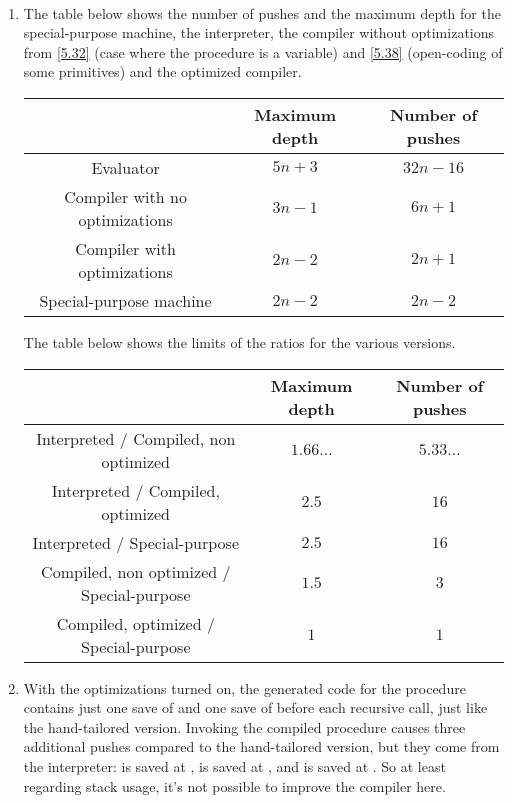 \begin{exe}[5.45]
    \ \vspace{-20pt}
    \begin{enumerate}
	\item The table below shows the number of pushes and the maximum depth 
	    for the special-purpose machine, the interpreter, the compiler 
	    without optimizations from \autoref{5.32} (case where the procedure 
	    is a variable) and \autoref{5.38} (open-coding of some primitives) 
	    and the optimized compiler.
	    \begin{center}
		\begin{tabular}{|c|c|c|}
		    \hline
		    & Maximum depth & Number of pushes \\\hline
		    Evaluator & $5n + 3$ & $32n - 16$ \\\hline
		    Compiler with no optimizations & $3n - 1$ & $6n + 1$ \\\hline
		    Compiler with optimizations & $2n - 2$ & $2n + 1$\\\hline
		    Special-purpose machine & $2n - 2$ & $2n - 2$ \\\hline
		\end{tabular}
	    \end{center}
	    The table below shows the limits of the ratios for the various 
	    versions.
	    \begin{center}
		\begin{tabular}{|c|c|c|}
		    \hline
		    & Maximum depth & Number of pushes \\\hline
		    Interpreted / Compiled, non optimized & $1.66…$ & $5.33…$ \\\hline
		    Interpreted / Compiled, optimized & $2.5$ & $16$ \\\hline
		    Interpreted / Special-purpose & $2.5$ & $16$ \\\hline
		    Compiled, non optimized / Special-purpose & $1.5$ & $3$ \\\hline
		    Compiled, optimized / Special-purpose & $1$ & $1$ \\\hline
		\end{tabular}
	    \end{center}
	\item With the optimizations turned on, the generated code for the 
	    procedure contains just one save of  and one save 
	    of  before each recursive call, just like the 
	    hand-tailored version. Invoking the compiled procedure causes three 
	    additional pushes compared to the hand-tailored version, but they 
	    come from the interpreter:  is saved at 
	    ,  is saved at 
	    , and  is saved at 
	    . So at least regarding stack usage, it’s 
	    not possible to improve the compiler here.


\end{enumerate}
\end{exe}

